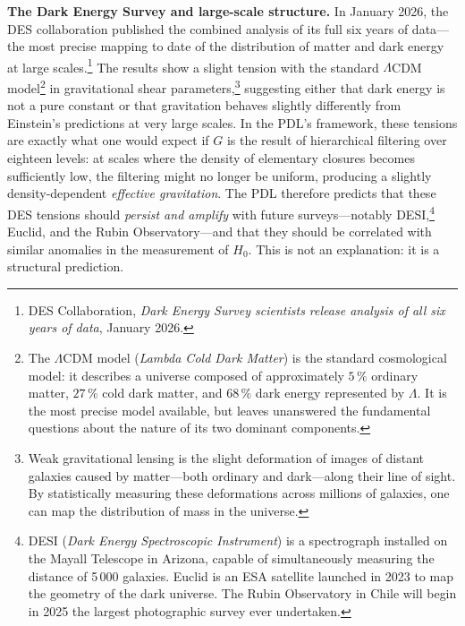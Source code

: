 \documentclass[12pt, a4paper, openright]{book}
\begin{document}
\textbf{The Dark Energy Survey and large-scale structure.} In January 2026, the DES collaboration published the combined analysis of its full six years of data---the most precise mapping to date of the distribution of matter and dark energy at large scales.\footnote{DES Collaboration, \textit{Dark Energy Survey scientists release analysis of all six years of data}, January 2026.} The results show a slight tension with the standard $\Lambda$CDM model\footnote{The $\Lambda$CDM model (\textit{Lambda Cold Dark Matter}) is the standard cosmological model: it describes a universe composed of approximately $5\,\%$ ordinary matter, $27\,\%$ cold dark matter, and $68\,\%$ dark energy represented by $\Lambda$. It is the most precise model available, but leaves unanswered the fundamental questions about the nature of its two dominant components.} in gravitational shear parameters,\footnote{Weak gravitational lensing is the slight deformation of images of distant galaxies caused by matter---both ordinary and dark---along their line of sight. By statistically measuring these deformations across millions of galaxies, one can map the distribution of mass in the universe.} suggesting either that dark energy is not a pure constant or that gravitation behaves slightly differently from Einstein's predictions at very large scales. In the PDL's framework, these tensions are exactly what one would expect if $G$ is the result of hierarchical filtering over eighteen levels: at scales where the density of elementary closures becomes sufficiently low, the filtering might no longer be uniform, producing a slightly density-dependent \emph{effective gravitation}. The PDL therefore predicts that these DES tensions should \emph{persist and amplify} with future surveys---notably DESI,\footnote{DESI (\textit{Dark Energy Spectroscopic Instrument}) is a spectrograph installed on the Mayall Telescope in Arizona, capable of simultaneously measuring the distance of 5\,000 galaxies. Euclid is an ESA satellite launched in 2023 to map the geometry of the dark universe. The Rubin Observatory in Chile will begin in 2025 the largest photographic survey ever undertaken.} Euclid, and the Rubin Observatory---and that they should be correlated with similar anomalies in the measurement of $H_0$. This is not an explanation: it is a structural prediction.

\medskip
\end{document}
